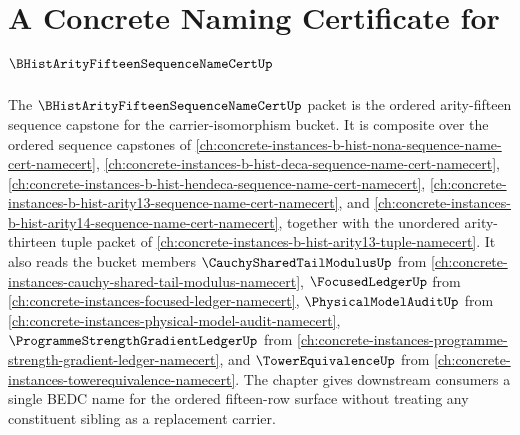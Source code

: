 \chapter{A Concrete Naming Certificate for $\BHistArityFifteenSequenceNameCertUp$}
\label{ch:concrete-instances-b-hist-arity15-sequence-name-cert-namecert}

The $\BHistArityFifteenSequenceNameCertUp$ packet is the ordered arity-fifteen sequence capstone for the carrier-isomorphism bucket. It is composite over the ordered sequence capstones of \autoref{ch:concrete-instances-b-hist-nona-sequence-name-cert-namecert}, \autoref{ch:concrete-instances-b-hist-deca-sequence-name-cert-namecert}, \autoref{ch:concrete-instances-b-hist-hendeca-sequence-name-cert-namecert}, \autoref{ch:concrete-instances-b-hist-arity13-sequence-name-cert-namecert}, and \autoref{ch:concrete-instances-b-hist-arity14-sequence-name-cert-namecert}, together with the unordered arity-thirteen tuple packet of \autoref{ch:concrete-instances-b-hist-arity13-tuple-namecert}. It also reads the bucket members $\CauchySharedTailModulusUp$ from \autoref{ch:concrete-instances-cauchy-shared-tail-modulus-namecert}, $\FocusedLedgerUp$ from \autoref{ch:concrete-instances-focused-ledger-namecert}, $\PhysicalModelAuditUp$ from \autoref{ch:concrete-instances-physical-model-audit-namecert}, $\ProgrammeStrengthGradientLedgerUp$ from \autoref{ch:concrete-instances-programme-strength-gradient-ledger-namecert}, and $\TowerEquivalenceUp$ from \autoref{ch:concrete-instances-towerequivalence-namecert}. The chapter gives downstream consumers a single BEDC name for the ordered fifteen-row surface without treating any constituent sibling as a replacement carrier.

